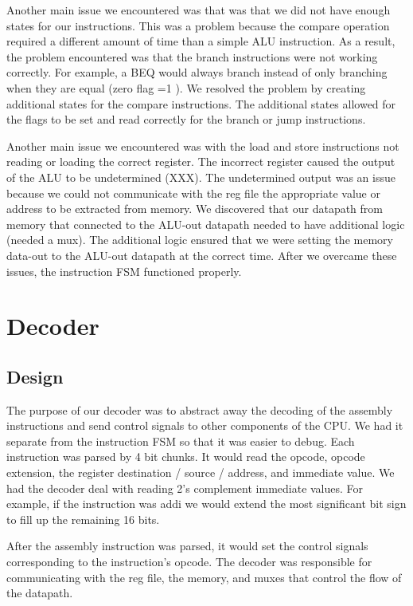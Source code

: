 \documentclass[11pt]{article}
\begin{document}
Another main issue we encountered was that was that we did not have enough states for our instructions. This was a problem because the compare operation required a different amount of time than a simple ALU instruction. As a result, the problem encountered was that the branch instructions were not working correctly. For example, a BEQ would always branch instead of only branching when they are equal (zero flag =1 ). We resolved the problem by creating additional states for the compare instructions. The additional states allowed for the flags to be set and read correctly for the branch or jump instructions. 

Another main issue we encountered was with the load and store instructions not reading or loading the correct register. The incorrect register caused the output of the ALU to be undetermined (XXX). The undetermined output was an issue because we could not communicate with the reg file the appropriate value or address to be extracted from memory. We discovered that our datapath from memory that connected to the ALU-out datapath needed to have additional logic (needed a mux). The additional logic ensured that we were setting the memory data-out to the ALU-out datapath at the correct time. After we overcame these issues, the instruction FSM functioned properly.

\section{Decoder}

\subsection{Design}
The purpose of our decoder was to abstract away the decoding of the assembly instructions and send control signals to other components of the CPU. We had it separate from the instruction FSM so that it was easier to debug. Each instruction was parsed by 4 bit chunks. It would read the opcode,  opcode extension, the register destination / source / address, and immediate value. We had the decoder deal with reading 2’s complement immediate values. For example, if the instruction was addi we would extend the most significant bit sign to fill up the remaining 16 bits. 

After the assembly instruction was parsed, it would set the control signals corresponding to the instruction’s opcode. The decoder was responsible for communicating with the reg file, the memory, and muxes that control the flow of the datapath. 
\end{document}
